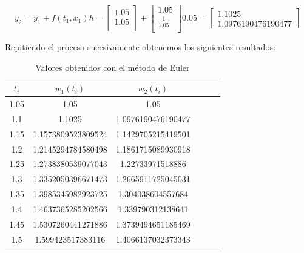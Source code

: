 \documentclass[12pt]{article}       %
\begin{document}
\begin{equation*}
y_2=y_1+f(t_1,x_1)h=\begin{bmatrix}
1.05\\
1.05\\
\end{bmatrix} + \begin{bmatrix}
1.05\\
\frac{1}{1.05}\\
\end{bmatrix}0.05=\begin{bmatrix}
1.1025\\
1.0976190476190477 

\end{bmatrix}  
\end{equation*}

Repitiendo el proceso sucesivamente obtenemos los siguientes resultados: 


\begin{table}[H]
    \centering
    \setlength\extrarowheight{2.5pt}
    
    \begin{tabular}{|c|c|c|c|c|c}
        \hline
        \textbf{$t_i$} & {\textbf{$w_1(t_i)$}} & {\textbf{$w_2(t_i)$}}\\ 
            \hline
             1.05 & 1.05 & 1.05 \\
             \hline
              1.1 & 1.1025 & 1.0976190476190477  \\
             \hline
             1.15 & 1.1573809523809524 & 1.1429705215419501 \\
             \hline
              1.2 & 1.2145294784580498 & 1.1861715089930918 \\
              \hline
             1.25 & 1.2738380539077043 & 1.22733971518886 \\
             \hline
              1.3 & 1.3352050396671473 & 1.2665911725045031 \\
              \hline
             1.35 & 1.3985345982923725 & 1.304038604557684 \\
             \hline
              1.4 & 1.4637365285202566 & 1.339790312138641 \\
              \hline
             1.45 & 1.5307260441271886 & 1.3739494651185469 \\
             \hline
              1.5 & 1.599423517383116 & 1.4066137032373343 \\
              \hline

    \end{tabular}
    
    \caption{Valores obtenidos con el método de Euler}           
\end{table}
\end{document}

